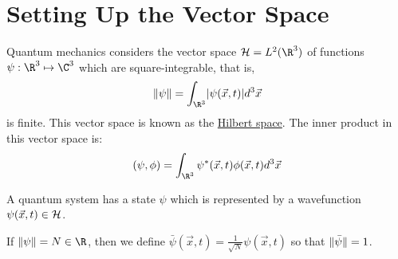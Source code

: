 \documentclass[../Main.tex]{subfiles}
\begin{document}
\section{Setting Up the Vector Space}
Quantum mechanics considers the vector space $\hilb = L^2(\R^3)$ of functions $\psi : \R^3 \mapsto \C^3$ which are square-integrable, that is,
\begin{equation*}
    \norm{\psi} = \int_{\R^3} \abs{\psi(\vec{x}, t)}d^3\vec{x}
\end{equation*}
is finite. This vector space is known as the \underline{Hilbert space}. The inner product in this vector space is:
\begin{equation*}
    \inn{\psi}{\phi} = \int_{\R^3} \psi^*(\vec{x}, t) \phi(\vec{x}, t) d^3\vec{x}
\end{equation*}

A quantum system has a state $\psi$ which is represented by a wavefunction $\psi(\vec{x}, t) \in \mathcal{H}$.

If $\norm{\psi} = N \in \R$, then we define $\bar{\psi}(\vec{x}, t) = \frac{1}{\sqrt{N}} \psi(\vec{x}, t)$ so that $\lVert\bar{\psi}\rVert = 1$.
\end{document}

